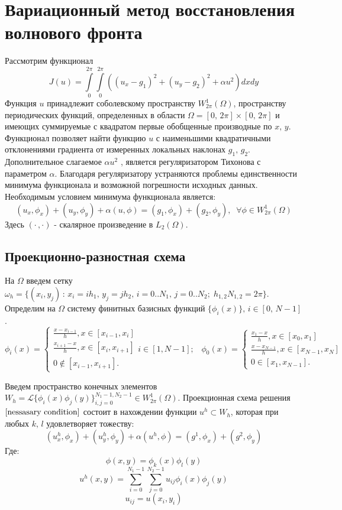 \documentclass{article}
\begin{document}
\newpage

\section{Вариационный метод восстановления волнового фронта}

Рассмотрим функционал $$J(u) = \int \limits_0^{2\pi} \int \limits_0^{2\pi} ((u_x - g_1)^2 + (u_y-g_2)^2 + \alpha u^2 )dxdy$$
Функция $u$ принадлежит соболевскому пространству $W_{2\pi}^{1}(\Omega)$, пространству периодических функций, определенных в области $\Omega = [0,\,2\pi]  \times [0,\,2\pi]$ и имеющих суммируемые с квадратом первые обобщенные производные по $x,\,y$. Функционал позволяет найти функцию $u$ с наименьшими квадратичными отклонениями градиента от измеренных локальных наклонах $g_1,\, g_2$. Дополнительное слагаемое $\alpha u^2$ , является регуляризатором Тихонова с параметром $\alpha$. Благодаря регуляризатору устраняются проблемы единственности минимума функционала и возможной погрешности исходных данных. Необходимым условием минимума функционала является:
\begin{equation}\label{nessasary condition}
(u_x, \phi_x) + (u_y,\phi_y) + \alpha(u, \phi) = (g_1, \phi_x) + (g_2, \phi_y),\;\;\forall\phi \in W_{2\pi}^{1}(\Omega)
\end{equation}
Здесь $(\cdot\,,\cdot)$ - скалярное произведение в $L_2(\Omega)$.
\subsection{Проекционно-разностная схема}
На $\Omega$ введем сетку $\omega_h = \{(x_i, y_j) \,:\, x_i = ih_1,\,y_j = jh_2,\, i = 0..N_1,\, j = 0..N_2;\; h_{1,2}N_{1,2} = 2\pi\}$. Определим на $\Omega$ систему финитных базисных функций $\{\phi_i(x)\} ,\, i \in [0,\,N-1]$.
$$
\phi_i(x) = 
 \begin{cases}
  \frac{x-x_{i-1}}{h} , x \in [x_{i-1},x_i] \\ 
   \frac{x_{i+1} - x}{h}, x \in [x_{i},x_{i+1}]   \\
   0 \notin [x_{i-1},x_{i+1}].
 \end{cases} i \in [1, N-1];\;\;\;
\phi_0(x) = 
 \begin{cases}
  \frac{x_1-x}{h} , x \in [x_{0},x_1] \\ 
   \frac{x - x_{N-1}}{h}, x \in [x_{N-1},x_{N}]   \\
   0 \in [x_{1},x_{N-1}].
 \end{cases}
$$

Введем пространство конечных элементов $W_h = \mathscr{L}\{\phi_i(x)\phi_j(y)\}_{i,j=0}^{N_1 - 1,N_2-1} \in W_{2\pi}^{1}(\Omega)$. Проекционная схема решения $\ref{nessasary condition}$ состоит в нахождении функции $u^h \subset W_h$, которая при любых $k,\,l$ удовлетворяет тожеству:
\begin{equation}\label{mult diff scheme}
(u_x^h,\phi_x)+(u_y^h,\phi_y) + \alpha(u^h,\phi) = (g^1,\phi_x) + (g^2,\phi_y)
\end{equation}
Где:
$$\phi(x,y) = \phi_k(x)\phi_l(y)$$
$$u^h(x,y) = \sum \limits_{i=0}^{N_1-1} \sum \limits_{j=0}^{N_2-1} u_{ij}\phi_i(x)\phi_j(y)$$
$$u_{ij} = u(x_i,y_i)$$
\end{document}
